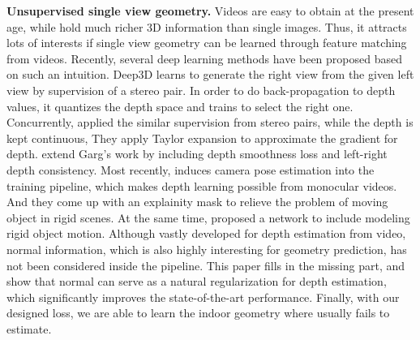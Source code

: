 \textbf{Unsupervised single view geometry.}
Videos are easy to obtain at the present age, while hold much richer 3D information than single images. Thus, it attracts lots of interests if single view geometry can be learned through feature matching from videos. Recently, several deep learning methods have been proposed based on such an intuition. Deep3D \cite{xie2016deep3d} learns to generate the right view from the given left view by supervision of a stereo pair. In order to do back-propagation to depth values, it quantizes the depth space and trains to select the right one. 
Concurrently, \cite{GargBR16} applied the similar supervision from stereo pairs, while the depth is kept continuous, They apply Taylor expansion to approximate the gradient for depth. \cite{godard2016unsupervised} extend Garg's work by including depth smoothness loss and left-right depth consistency. Most recently, \cite{zhou2017unsupervised} induces camera pose estimation into the training pipeline, which makes depth learning possible from monocular videos. And they come up with an explainity mask to relieve the problem of moving object in rigid scenes.
At the same time, \cite{kuznietsov2017semi} proposed a network to include modeling rigid object motion. Although vastly developed for depth estimation from video, normal information, which is also highly interesting for geometry prediction, has not been considered inside the pipeline. This paper fills in the missing part, and show that normal can serve as a natural regularization for depth estimation, which significantly improves the state-of-the-art performance. Finally, with our designed loss, we are able to learn the indoor geometry where \cite{zhou2017unsupervised} usually fails to estimate.

